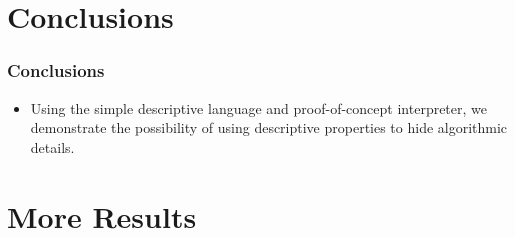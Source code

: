 \documentclass{beamer}
\begin{document}



\section{Conclusions} %

\begin{frame}
\frametitle{Conclusions}

\begin{itemize}
\item Using the simple descriptive language and proof-of-concept interpreter, we demonstrate the possibility of using descriptive properties to hide algorithmic details.
\end{itemize}
\end{frame}

\section{More Results} %
\end{document}
